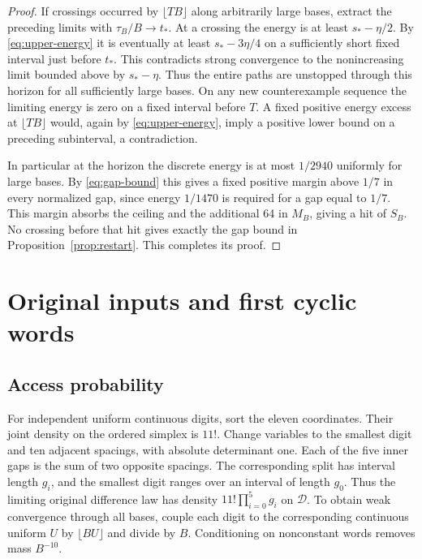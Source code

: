 \documentclass[11pt,reqno]{amsart}
\theoremstyle{remark}
\begin{document}
\begin{proof}
If crossings occurred by \(\lfloor TB\rfloor\) along arbitrarily large bases, extract the preceding limits with \(\tau_B/B\to t_*\). At a crossing the energy is at least \(s_*-\eta/2\). By \eqref{eq:upper-energy} it is eventually at least \(s_*-3\eta/4\) on a sufficiently short fixed interval just before \(t_*\). This contradicts strong convergence to the nonincreasing limit bounded above by \(s_*-\eta\). Thus the entire paths are unstopped through this horizon for all sufficiently large bases. On any new counterexample sequence the limiting energy is zero on a fixed interval before \(T\). A fixed positive energy excess at \(\lfloor TB\rfloor\) would, again by \eqref{eq:upper-energy}, imply a positive lower bound on a preceding subinterval, a contradiction.

In particular at the horizon the discrete energy is at most \(1/2940\) uniformly for large bases. By \eqref{eq:gap-bound} this gives a fixed positive margin above \(1/7\) in every normalized gap, since energy \(1/1470\) is required for a gap equal to \(1/7\). This margin absorbs the ceiling and the additional 64 in \(M_B\), giving a hit of \(S_B\). No crossing before that hit gives exactly the gap bound in Proposition~\ref{prop:restart}. This completes its proof.
\end{proof}

\section{Original inputs and first cyclic words}\label{sec:bridge}

\subsection{Access probability}\label{sec:access}
For independent uniform continuous digits, sort the eleven coordinates. Their joint density on the ordered simplex is \(11!\). Change variables to the smallest digit and ten adjacent spacings, with absolute determinant one. Each of the five inner gaps is the sum of two opposite spacings. The corresponding split has interval length \(g_i\), and the smallest digit ranges over an interval of length \(g_0\). Thus the limiting original difference law has density \(11!\prod_{i=0}^5 g_i\) on \(\mathcal D\). To obtain weak convergence through all bases, couple each digit to the corresponding continuous uniform \(U\) by \(\lfloor BU\rfloor\) and divide by \(B\). Conditioning on nonconstant words removes mass \(B^{-10}\).
\end{document}
